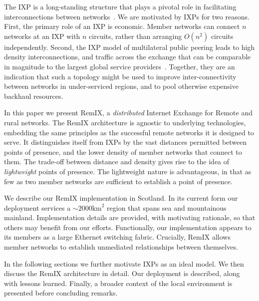 The \acf{IXP} is a long-standing structure that plays a pivotal role in
facilitating interconnections between networks~\cite{Ager:2012,Chatzis:2013}. We
are motivated by \acp{IXP} for two reasons. First, the primary role of an
\ac{IXP} is economic. Member networks can connect $n$ networks at an IXP with
$n$ circuits, rather than arranging $O(n^2)$ circuits independently.
Second, the \ac{IXP} model of multilateral public peering leads to high density
interconnections, and traffic across the exchange that can be comparable in
magnitude to the largest global service providers~\cite{Ager:2012}. Together,
they are an indication that such a topology might be used to improve
inter-connectivity between networks in under-serviced regions, and to pool
otherwise expensive backhaul resources.

In this paper we present RemIX, a \emph{distributed} Internet Exchange for
Remote and rural networks. The RemIX architecture is agnostic to underlying
technologies, embedding the same principles as the successful remote networks it
is designed to serve. It distinguishes itself from \acp{IXP} by the vast
distances permitted between points of presence, and the lower density of member
networks that connect to them. The trade-off between distance and density gives
rise to the idea of \emph{lightweight} points of presence. The lightweight
nature is advantageous, in that as few as two member networks are sufficient to
establish a point of presence.

We describe our RemIX implementation in Scotland. In its current form our
deployment services a $\sim 2000\mathrm{km}^2$ region that spans sea and mountainous
mainland. Implementation details are provided, with motivating rationale, so
that others may benefit from our efforts. Functionally, our implementation
appears to its members as a large Ethernet switching fabric. Crucially, RemIX
allows member networks to establish unmediated relationships between themselves.

In the following sections we further motivate \acp{IXP} as an ideal model. We
then discuss the RemIX architecture in detail. Our deployment is described,
along with lessons learned. Finally, a broader context of the local environment
is presented before concluding remarks.
